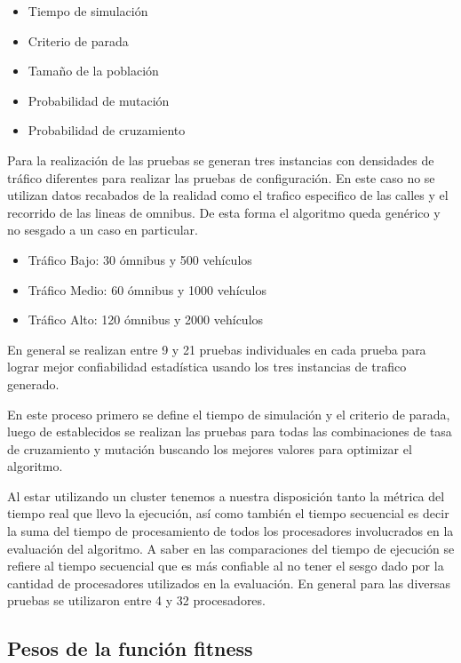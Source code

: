 \begin{itemize}
	\item Tiempo de simulación	
	\item Criterio de parada
	\item Tamaño de la población
	\item Probabilidad de mutación
	\item Probabilidad de cruzamiento
\end{itemize}

Para la realización de las pruebas se generan tres instancias con densidades de tráfico diferentes para realizar las pruebas de configuración. En este caso no se utilizan datos recabados de la realidad como  el trafico especifico de las calles y el recorrido de las lineas de omnibus. De esta forma el algoritmo queda genérico y no sesgado a un caso en particular.


\begin{itemize}
	\item Tráfico Bajo: 30 ómnibus y 500 vehículos	
	\item Tráfico Medio: 60 ómnibus y 1000 vehículos
	\item Tráfico Alto: 120 ómnibus y 2000 vehículos
\end{itemize}



En general se realizan entre 9 y 21 pruebas individuales en cada prueba para lograr mejor confiabilidad estadística usando los tres instancias de trafico generado.

En este proceso primero se define el tiempo de simulación y el criterio de parada, luego de establecidos se realizan las pruebas para todas las combinaciones de tasa de cruzamiento y mutación buscando los mejores valores para optimizar el algoritmo.

Al estar utilizando un cluster tenemos a nuestra disposición tanto la métrica del tiempo real que llevo la ejecución, así como también el tiempo secuencial es decir la suma del tiempo de procesamiento de todos los procesadores involucrados en la evaluación del algoritmo. 
A saber en las comparaciones del tiempo de ejecución se refiere al tiempo secuencial que es más confiable al no tener el sesgo dado por la cantidad de procesadores utilizados en la evaluación.
En general para las diversas pruebas se utilizaron entre 4 y 32 procesadores.



\subsection{Pesos de la función fitness}

